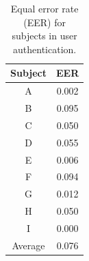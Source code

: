 \documentclass[english,preprint,JIP]{ipsj}
\begin{document}
\begin{table}[!t]
  \centering
  \caption{Equal error rate (EER) for subjects in user authentication.}
  \begin{tabular}{c|c} \hline\hline
    Subject & EER \\ \hline
    A & 0.002 \\
    B & 0.095 \\
    C & 0.050 \\
    D & 0.055 \\
    E & 0.006 \\
    F & 0.094 \\
    G & 0.012 \\
    H & 0.050 \\
    I & 0.000 \\ \hline
    Average & 0.076 \\ \hline
  \end{tabular}
  \label{tab:EER_num}
\end{table}
\end{document}
